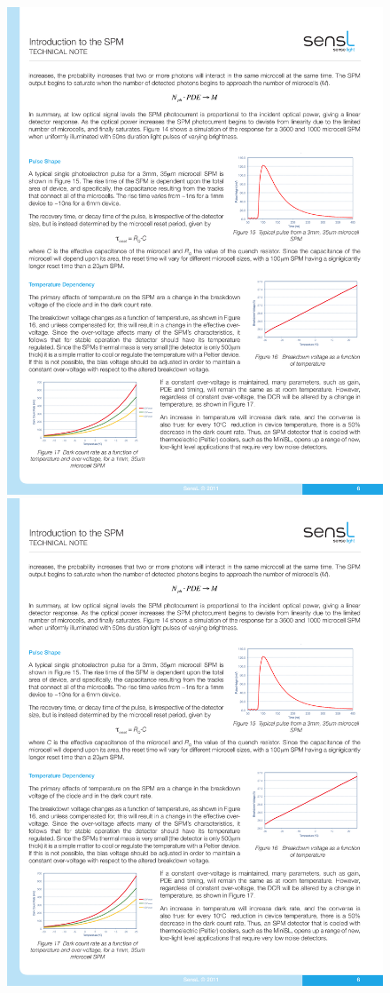 \begin{figure}[!bhtp]
	\centering
	\includegraphics[scale=0.9]{img/VbTdep.pdf}
	\includegraphics[scale=0.9]{img/DCRTdep.pdf}

\end{figure}
